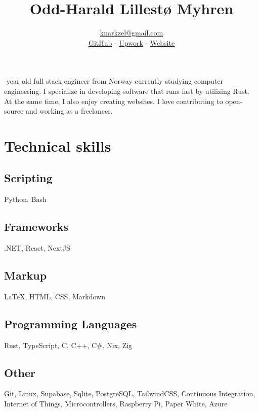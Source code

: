 \documentclass[12pt]{article}
\renewcommand{\maketitle}{
  \begin{center}
    {\huge\bfseries\thetitle}
    
    \vspace{1em}
    
    \theauthor
  \end{center}
}
\begin{document}
\title{Odd-Harald Lillestø Myhren}
\author{\href{mailto:knarkzel@gmail.com}{knarkzel@gmail.com} \\ \vspace{0.5em} \href{https://github.com/knarkzel}{GitHub} - \href{https://www.upwork.com/freelancers/~01a292bc9be02825f6}{Upwork} - \href{https://knarkzel.github.io/}{Website}}

\maketitle

-year old full stack engineer from Norway currently studying computer engineering. I
specialize in developing software that runs fast by utilizing Rust. At the same time, I also
enjoy creating websites. I love contributing to open-source and working as a freelancer.

\section{Technical skills}

\subsection{Scripting}

Python, Bash

\subsection{Frameworks}

.NET, React, NextJS

\subsection{Markup}

\LaTeX, HTML, CSS, Markdown

\subsection{Programming Languages}

Rust, TypeScript, C, C++, C\#, Nix, Zig

\subsection{Other}

Git, Linux, Supabase, Sqlite, PostgreSQL, TailwindCSS, Continuous Integration,
Internet of Things, Microcontrollers, Raspberry Pi, Paper White, Azure
\end{document}

